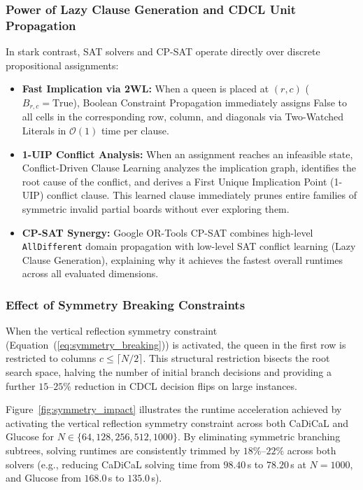 \documentclass[a4paper,fleqn]{cas-sc}
\begin{document}
\subsubsection{Power of Lazy Clause Generation and CDCL Unit Propagation}
In stark contrast, SAT solvers and CP-SAT operate directly over discrete propositional assignments:
\begin{itemize}
    \item \textbf{Fast Implication via 2WL:} When a queen is placed at $(r, c)$ ($B_{r, c} = \text{True}$), Boolean Constraint Propagation immediately assigns False to all cells in the corresponding row, column, and diagonals via Two-Watched Literals in $\mathcal{O}(1)$ time per clause.
    \item \textbf{1-UIP Conflict Analysis:} When an assignment reaches an infeasible state, Conflict-Driven Clause Learning analyzes the implication graph, identifies the root cause of the conflict, and derives a First Unique Implication Point (1-UIP) conflict clause. This learned clause immediately prunes entire families of symmetric invalid partial boards without ever exploring them.
    \item \textbf{CP-SAT Synergy:} Google OR-Tools CP-SAT combines high-level \texttt{AllDifferent} domain propagation with low-level SAT conflict learning (Lazy Clause Generation), explaining why it achieves the fastest overall runtimes across all evaluated dimensions.
\end{itemize}

\subsubsection{Effect of Symmetry Breaking Constraints}
When the vertical reflection symmetry constraint (Equation~(\ref{eq:symmetry_breaking})) is activated, the queen in the first row is restricted to columns $c \le \lceil N/2 \rceil$. This structural restriction bisects the root search space, halving the number of initial branch decisions and providing a further $15\text{--}25\%$ reduction in CDCL decision flips on large instances.

Figure~\ref{fig:symmetry_impact} illustrates the runtime acceleration achieved by activating the vertical reflection symmetry constraint across both CaDiCaL and Glucose for $N \in \{64, 128, 256, 512, 1000\}$. By eliminating symmetric branching subtrees, solving runtimes are consistently trimmed by $18\%\text{--}22\%$ across both solvers (e.g., reducing CaDiCaL solving time from $98.40$\,s to $78.20$\,s at $N = 1000$, and Glucose from $168.0$\,s to $135.0$\,s).
\end{document}
